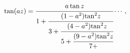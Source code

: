 \[\mathop{\tan\/}\nolimits\!\left(az\right)=\cfrac{a\mathop{\tan\/}\nolimits z}{%
1+\cfrac{(1-a^{2}){\mathop{\tan\/}\nolimits^{2}}z}{3+\cfrac{(4-a^{2}){\mathop{%
\tan\/}\nolimits^{2}}z}{5+\cfrac{(9-a^{2}){\mathop{\tan\/}\nolimits^{2}}z}{7+}%
}}}\cdots,\]